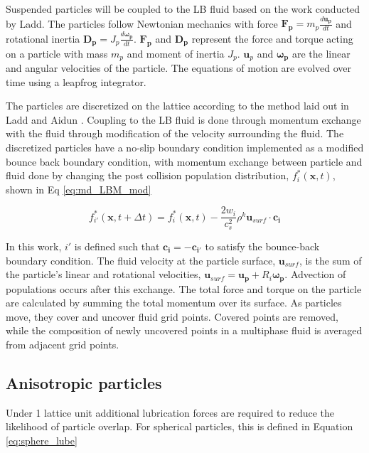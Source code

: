 Suspended particles will be coupled to the LB fluid based on the work conducted by Ladd. \cite{ladd_numerical_1994, 
aidun_direct_1998, ladd_lattice-boltzmann_2001} The particles follow Newtonian mechanics with force 
$\mathbf{F_p} = m_p\frac{d \mathbf{u_p} }{dt}$ and rotational inertia $\mathbf{D_p} = J_p \frac{d \mathbf{\omega_{p}}}{dt}$. 
$\mathbf{F_p}$ and $\mathbf{D_p}$ represent the force and torque acting on a particle with mass $m_p$ and moment of inertia 
$J_p$. $\mathbf{u}_p$ and $\mathbf{\omega_{p}}$ are the linear and angular velocities of the particle. The equations of 
motion are evolved over time using a leapfrog integrator. \cite{jansen_bijels_2011}

The particles are discretized on the lattice according to the method laid out in Ladd and Aidun 
\cite{ladd_lattice-boltzmann_2001}. Coupling to the LB fluid is done through momentum exchange with the 
fluid through modification of the velocity surrounding the fluid. The discretized particles have a no-slip 
boundary condition implemented as a modified bounce back boundary condition, with momentum exchange between 
particle and fluid done by changing the post collision population distribution, $f^{*}_{i}(\mathbf{x}, t)$, 
shown in Eq \ref{eq:md_LBM_mod}

\begin{equation}
    f^{*}_{i'}(\mathbf{x}, t + \Delta t) = f^{*}_{i}(\mathbf{x}, t) - \frac{2 w_{i}}{c_s^2}\rho^k \mathbf{u}_{surf} 
    \cdot \mathbf{c_i}
    \label{eq:md_LBM_mod}
\end{equation}

In this work, $i'$ is defined such that $\mathbf{c_i} = -\mathbf{c_{i'}}$ to satisfy the bounce-back boundary condition. 
The fluid velocity at the particle surface, $\mathbf{u}_{surf}$, is the sum of the particle's linear and rotational 
velocities, $\mathbf{u}_{surf} = \mathbf{u_p} + R_i\mathbf{\omega_p}$. Advection of populations occurs after this exchange. 
The total force and torque on the particle are calculated by summing the total momentum over its surface. As particles 
move, they cover and uncover fluid grid points. Covered points are removed, while the composition of newly uncovered 
points in a multiphase fluid is averaged from adjacent grid points. 

\subsection{Anisotropic particles}

Under 1 lattice unit additional lubrication forces are required to reduce the likelihood of particle overlap. For 
spherical particles, this is defined in Equation \ref{eq:sphere_lube}

